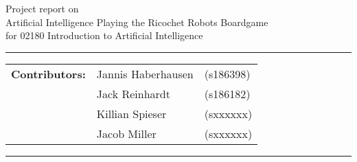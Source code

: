 \documentclass[a4paper,10pt]{article}
\begin{document}
\begin{center}
Project report on\\
\vspace{0.5cm}
{{\Large \sc Artificial Intelligence Playing the Ricochet Robots Boardgame}}\\
\vspace{0.5cm} for 02180 Introduction to Artificial Intelligence
\end{center}
\rule{\textwidth}{0.5pt}
\begin{description}
\item\begin{tabular}{rll}
    \textbf{Contributors:}& Jannis Haberhausen &(s186398)\\ & Jack Reinhardt &(s186182)\\ & Killian Spieser &(sxxxxxx)\\ & Jacob Miller &(sxxxxxx) \\
\end{tabular}
\end{description}
\rule{\textwidth}{1pt}

\tableofcontents
\thispagestyle{empty}
\newpage
\end{document}
